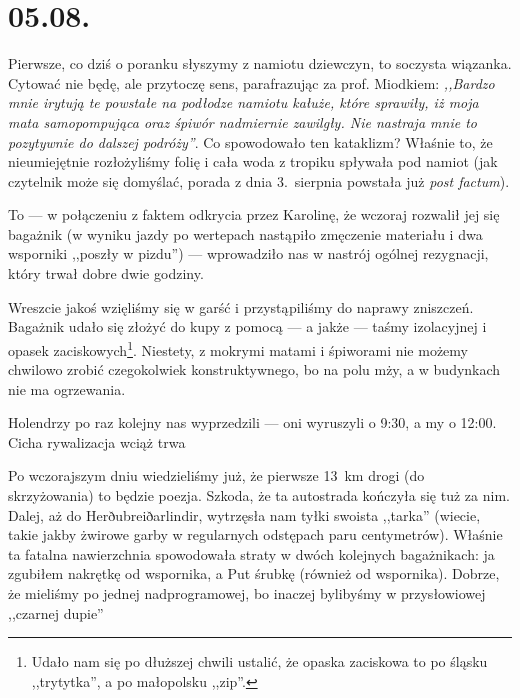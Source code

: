 \chapter*{05.08.}

Pierwsze, co dziś o poranku słyszymy z namiotu dziewczyn, to soczysta wiązanka. Cytować nie będę, ale przytoczę sens, parafrazując za prof. Miodkiem: \emph{,,Bardzo mnie irytują te powstałe na podłodze namiotu kałuże, które sprawiły, iż moja mata samopompująca oraz śpiwór nadmiernie zawilgły. Nie nastraja mnie to pozytywnie do dalszej podróży''}. Co spowodowało ten kataklizm? Właśnie to, że nieumiejętnie rozłożyliśmy folię i cała woda z tropiku spływała pod namiot (jak czytelnik może się domyślać, porada z dnia 3.~sierpnia powstała już \textit{post factum}).

To --- w połączeniu z faktem odkrycia przez Karolinę, że wczoraj rozwalił jej się bagażnik (w wyniku jazdy po wertepach nastąpiło zmęczenie materiału i dwa wsporniki ,,poszły w pizdu'') --- wprowadziło nas w nastrój ogólnej rezygnacji, który trwał dobre dwie godziny.

Wreszcie jakoś wzięliśmy się w garść i przystąpiliśmy do naprawy zniszczeń. Bagażnik udało się złożyć do kupy z pomocą --- a jakże --- taśmy izolacyjnej i opasek zaciskowych\footnote{Udało nam się po dłuższej chwili ustalić, że opaska zaciskowa to po śląsku ,,trytytka'', a po małopolsku ,,zip''.}. Niestety, z mokrymi matami i śpiworami nie możemy chwilowo zrobić czegokolwiek konstruktywnego, bo na polu mży, a w budynkach nie ma ogrzewania.

Holendrzy po raz kolejny nas wyprzedzili --- oni wyruszyli o 9:30, a my o 12:00. Cicha rywalizacja wciąż trwa\textellipsis

Po wczorajszym dniu wiedzieliśmy już, że pierwsze 13~km drogi (do skrzyżowania) to będzie poezja. Szkoda, że ta autostrada kończyła się tuż za nim. Dalej, aż do Herðubreiðarlindir, wytrzęsła nam tyłki swoista ,,tarka'' (wiecie, takie jakby żwirowe garby w regularnych odstępach paru centymetrów). Właśnie ta fatalna nawierzchnia spowodowała straty w dwóch kolejnych bagażnikach: ja zgubiłem nakrętkę od wspornika, a Put śrubkę (również od wspornika). Dobrze, że mieliśmy po jednej nadprogramowej, bo inaczej bylibyśmy w przysłowiowej ,,czarnej dupie''\textellipsis


